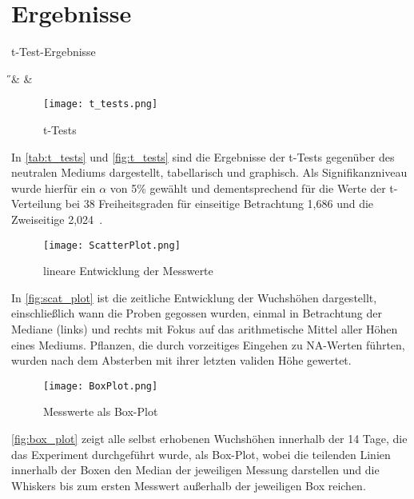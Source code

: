 \section{Ergebnisse} %
    \label{sec:ergebnisse}
    \begin{table}[h]
        \centering
        \caption{t-Test-Ergebnisse}
        \label{tab:t_tests}
        {\H & \pH & \NaCl}
    \end{table}

    \begin{figure}[h]
        \texttt{[image: t\_tests.png]}
        \caption{t-Tests}
        \label{fig:t_tests}
    \end{figure}
    In \autoref{tab:t_tests} und \autoref{fig:t_tests} sind die Ergebnisse der t-Tests gegenüber des neutralen Mediums dargestellt, tabellarisch und graphisch. Als Signifikanzniveau wurde hierfür ein \( \alpha \) von 5\% gewählt und dementsprechend für die Werte der t-Verteilung bei 38 Freiheitsgraden für einseitige Betrachtung 1,686 und die Zweiseitige 2,024\ \cite[vgl.][]{web:t-values}.
    \newpage

    \begin{figure}[h]
        \centering
        \texttt{[image: ScatterPlot.png]}
        \caption{lineare Entwicklung der Messwerte}
        \label{fig:scat_plot}
    \end{figure}
    In \autoref{fig:scat_plot} ist die zeitliche Entwicklung der Wuchshöhen dargestellt, einschließlich wann die Proben gegossen wurden, einmal in Betrachtung der Mediane (links) und rechts mit Fokus auf das arithmetische Mittel aller Höhen eines Mediums. Pflanzen, die durch vorzeitiges Eingehen zu NA-Werten führten, wurden nach dem Absterben mit ihrer letzten validen Höhe gewertet.

    \begin{figure}[h]
        \centering
        \texttt{[image: BoxPlot.png]}
        \caption{Messwerte als Box-Plot}
        \label{fig:box_plot}
    \end{figure}
    \autoref{fig:box_plot} zeigt alle selbst erhobenen Wuchshöhen innerhalb der 14 Tage, die das Experiment durchgeführt wurde, als Box-Plot, wobei die teilenden Linien innerhalb der Boxen den Median der jeweiligen Messung darstellen und die Whiskers bis zum ersten Messwert außerhalb der jeweiligen Box reichen.
    \newpage

